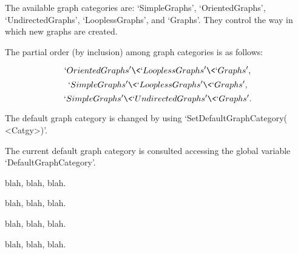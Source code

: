 
The  available  graph  categories  are:  `SimpleGraphs', `OrientedGraphs',
`UndirectedGraphs', `LooplessGraphs', and `Graphs'. They control the way in 
which new graphs are created.

The  partial  order  (by  inclusion) among graph categories is as follows:

$$`OrientedGraphs' \< `LooplessGraphs'  \<  `Graphs',$$    
$$`SimpleGraphs'  \<  `LooplessGraphs'  \< `Graphs',$$
$$`SimpleGraphs'  \<  `UndirectedGraphs' \< `Graphs'.$$ 

The default graph category is changed by using `SetDefaultGraphCategory( <Catgy>)'.

The current default graph category is consulted accessing the global variable
`DefaultGraphCategory'.



blah, blah, blah.


blah, blah, blah.


blah, blah, blah.


blah, blah, blah.


